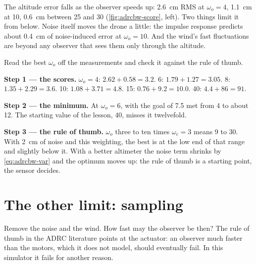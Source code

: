The altitude error falls as the observer speeds up: \SI{2.6}{cm} RMS at $\omega_o = 4$, \SI{1.1}{cm} at 10, \SI{0.6}{cm} between 25 and 30 (\cref{fig:adrcbw-score}, left). Two things limit it from below. Noise itself moves the drone a little: the impulse response predicts about \SI{0.4}{cm} of noise-induced error at $\omega_o = 10$. And the wind's fast fluctuations are beyond any observer that sees them only through the altitude.

\begin{example}
\label{ex:adrcbw-best}
Read the best $\omega_o$ off the measurements and check it against the rule of thumb.

\textbf{Step 1 — the scores.} $\omega_o = 4$: $2.62 + 0.58 = 3.2$. 6: $1.79 + 1.27 = 3.05$. 8: $1.35 + 2.29 = 3.6$. 10: $1.08 + 3.71 = 4.8$. 15: $0.76 + 9.2 = 10.0$. 40: $4.4 + 86 = 91$.

\textbf{Step 2 — the minimum.} At $\omega_o = 6$, with the goal of 7.5 met from 4 to about 12. The starting value of the lesson, 40, misses it twelvefold.

\textbf{Step 3 — the rule of thumb.} $\omega_o$ three to ten times $\omega_c = 3$ means 9 to 30. With \SI{2}{cm} of noise and this weighting, the best is at the low end of that range and slightly below it. With a better altimeter the noise term shrinks by \cref{eq:adrcbw-var} and the optimum moves up: the rule of thumb is a starting point, the sensor decides.
\end{example}

\section{The other limit: sampling}

Remove the noise and the wind. How fast may the observer be then? The rule of thumb in the ADRC literature points at the actuator: an observer much faster than the motors, which it does not model, should eventually fail. In this simulator it fails for another reason.

